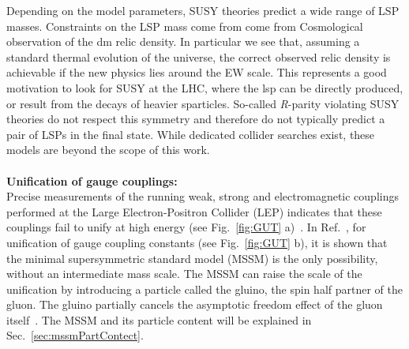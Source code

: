 Depending on the model parameters, SUSY theories predict a wide range of LSP masses.
Constraints on the LSP mass come from come from Cosmological observation of the \acrshort{dm} relic density. In particular we see that, assuming a standard thermal evolution of the universe, the correct observed relic density \cite{DM5} is achievable if the new physics lies around the EW scale. This represents a good motivation to look for SUSY at the LHC, where the \acrshort{lsp} can be directly produced, or result from the decays of heavier sparticles.
So-called {\it R}-parity violating SUSY theories do not respect this symmetry and therefore do not typically predict a pair of LSPs in the final state. While dedicated collider searches exist, these models are beyond the scope of this work.
\\
\\
\textbf{Unification of gauge couplings:}
\\
Precise measurements of the running weak, strong and electromagnetic couplings performed at the Large Electron-Positron Collider (LEP) indicates that these couplings fail to unify at high energy (see Fig.~\ref{fig:GUT} a)~\cite{ALEPH,GUTLep}. In Ref.~\cite{GUTLep}, for unification of gauge coupling constants (see Fig.~\ref{fig:GUT} b), it is shown that the minimal supersymmetric standard model (MSSM) is the only possibility, without an intermediate mass scale. The MSSM can raise the scale of the unification by introducing a particle called the gluino, the spin half partner of the gluon. The gluino partially cancels the asymptotic freedom effect of the gluon itself~\cite{Wil}. 
The MSSM and its particle content will be explained in Sec.~\ref{sec:mssmPartContect}.
